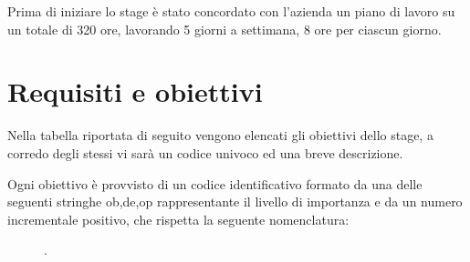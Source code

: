Prima di iniziare lo stage è stato concordato con l'azienda un piano di lavoro su un totale di 320 ore, lavorando 5 giorni a settimana, 8 ore per ciascun giorno. 

\section{Requisiti e obiettivi}
Nella tabella riportata di seguito vengono elencati gli obiettivi dello stage, a corredo degli stessi vi sarà un codice univoco ed una breve descrizione.

Ogni obiettivo è provvisto di un codice identificativo formato da una delle seguenti stringhe ob,de,op rappresentante il livello di importanza e da un numero incrementale positivo, che rispetta la seguente nomenclatura: 
\begin{figure}[htp]
	\centering
	[importanza][identificativo].
\end{figure}

